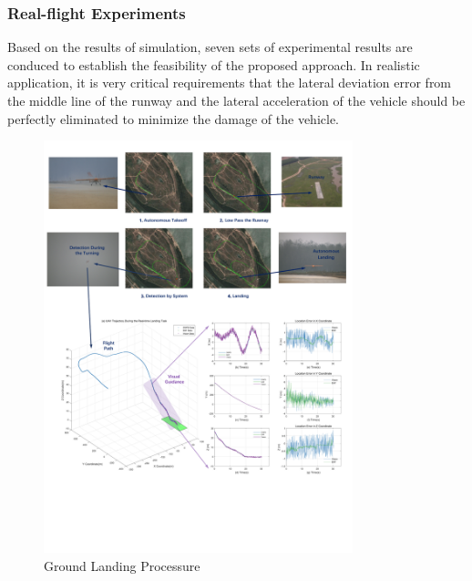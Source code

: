 \subsubsection{Real-flight Experiments}
Based on the results of simulation,  seven sets of experimental results are conduced to establish the feasibility of the proposed approach. In realistic application, it is very critical requirements that the lateral deviation error from the middle line of the runway and the lateral acceleration of the vehicle should be perfectly eliminated to minimize the damage of the vehicle.
\begin{figure}[!th]
	\centering
	\includegraphics[width=0.8\textwidth]{Figs/chp08_23_ground_landing.pdf}	
	\caption{Ground Landing Processure}
	\label{fig:chp08_23_ground_landing}
\end{figure}


